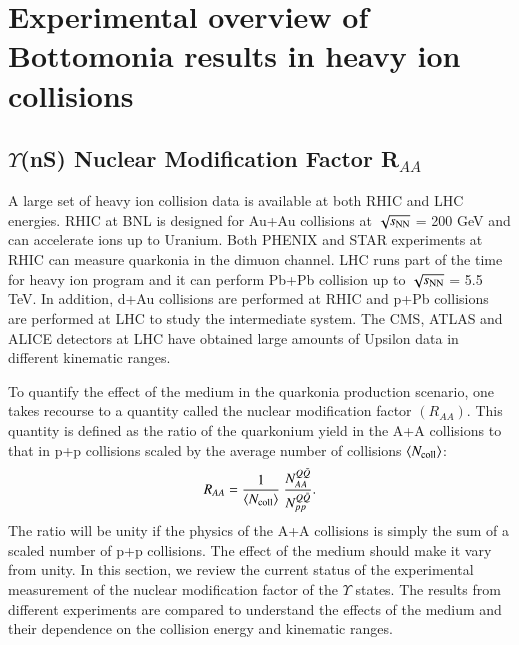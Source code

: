 \section{Experimental overview of Bottomonia results in heavy ion collisions}

\subsection{$\Upsilon$(nS) Nuclear Modification Factor R$_{AA}$}
A large set of heavy ion collision data is available at both RHIC and LHC energies.
RHIC at BNL is designed for Au+Au collisions
at $\sqrt{s_{\rm NN}}$ = 200 GeV and can accelerate ions up to Uranium. Both PHENIX and
STAR experiments at RHIC can measure quarkonia in the dimuon channel. 
LHC runs part of the time for heavy ion program and it can perform Pb+Pb collision
up to $\sqrt{s_{\rm NN}}$ = 5.5 TeV. In addition, d+Au collisions
are performed at RHIC and p+Pb collisions are performed at LHC to study the 
intermediate system. The CMS, ATLAS and ALICE detectors at LHC have obtained large
amounts of Upsilon data in different kinematic ranges.

To quantify the effect of the medium in the quarkonia production scenario, one takes
recourse to a quantity called the nuclear modification factor $(R_{AA})$. This quantity
is defined as the ratio of the quarkonium yield in the A+A collisions to that
in p+p collisions scaled by the average number of collisions $\langle N_{\rm coll} \rangle$: 
 \begin{equation}
 R_{AA} = \frac{1}{\langle N_{\rm coll} \rangle} \ \frac {N^{Q{\bar Q}}_{AA}} {N^{Q{\bar Q}}_{pp}}.
 \end{equation}
 The ratio will be unity if the physics of the A+A collisions is simply the sum of
 a scaled number of p+p collisions. The effect of the medium should make it vary from unity. 
In this section, we review the current status of the experimental measurement
of the nuclear modification factor of the $\Upsilon$ states. The results from
different experiments are compared to understand the effects of the medium and their
dependence on the collision energy and kinematic ranges. 

